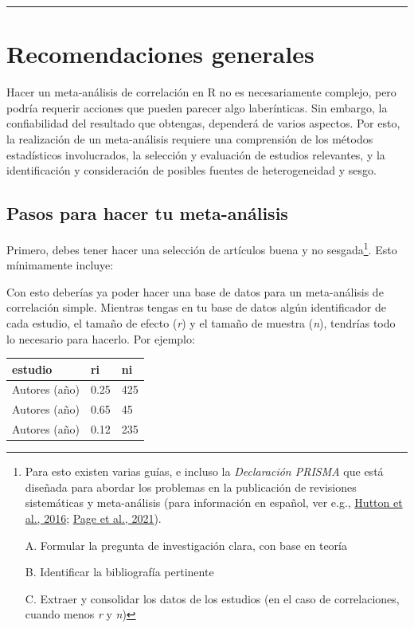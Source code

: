 \documentclass[
  bookmarksnumbered]{article}
\begin{document}
\begin{center}\rule{0.5\linewidth}{0.5pt}\end{center}

\hypertarget{recomendaciones-generales}{%
\section{Recomendaciones generales}\label{recomendaciones-generales}}

Hacer un meta-análisis de correlación en R no es necesariamente complejo, pero podría requerir acciones que pueden parecer algo laberínticas. Sin embargo, la confiabilidad del resultado que obtengas, dependerá de varios aspectos. Por esto, la realización de un meta-análisis requiere una comprensión de los métodos estadísticos involucrados, la selección y evaluación de estudios relevantes, y la identificación y consideración de posibles fuentes de heterogeneidad y sesgo.

\hypertarget{pasos-para-hacer-tu-meta-anuxe1lisis}{%
\subsection{Pasos para hacer tu meta-análisis}\label{pasos-para-hacer-tu-meta-anuxe1lisis}}

Primero, debes tener hacer una selección de artículos buena y no sesgada\footnote{Para esto existen varias guías, e incluso la \emph{Declaración PRISMA} que está diseñada para abordar los problemas en la publicación de revisiones sistemáticas y meta-análisis (para información en español, ver e.g., \protect\hyperlink{ref-huttonExtensionDeclaracionPRISMA2016}{Hutton et al., 2016}; \protect\hyperlink{ref-pageDeclaracionPRISMA20202021}{Page et al., 2021}).

  A. Formular la pregunta de investigación clara, con base en teoría

  B. Identificar la bibliografía pertinente

  C. Extraer y consolidar los datos de los estudios (en el caso de correlaciones, cuando menos \emph{r} y \emph{n})}. Esto mínimamente incluye:

Con esto deberías ya poder hacer una base de datos para un meta-análisis de correlación simple. Mientras tengas en tu base de datos algún identificador de cada estudio, el tamaño de efecto (\emph{r}) y el tamaño de muestra (\emph{n}), tendrías todo lo necesario para hacerlo. Por ejemplo:

\begin{longtable}[]{@{}lll@{}}
\toprule()
estudio & ri & ni \\
\midrule()
\endhead
Autores (año) & 0.25 & 425 \\
Autores (año) & 0.65 & 45 \\
Autores (año) & 0.12 & 235 \\
\bottomrule()
\end{longtable}
\end{document}
